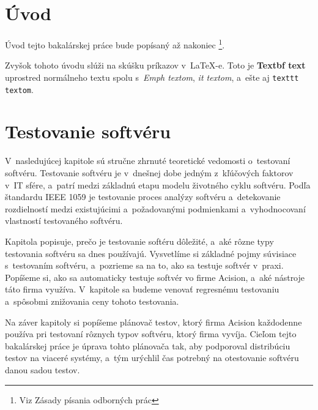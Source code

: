 



%
%
\chapter{Úvod}
\label{kapitola:uvod}
Úvod tejto bakalárskej práce bude popísaný až nakoniec
\footnote{Viz Zásady písania odborných prác}.

Zvyšok tohoto úvodu slúži na skúšku príkazov v~\LaTeX-e.
Toto je \textbf{Textbf text} uprostred normálneho textu spolu 
s~\emph{Emph textom}, {\it it textom}, a~ešte aj \texttt{texttt textom}.



%
%
\chapter{Testovanie softvéru}
\label{kapitola:testovanie_softveru}
V~nasledujúcej kapitole sú stručne zhrnuté teoretické vedomosti 
o~testovaní softvéru. 
Testovanie softvéru je v~dnešnej dobe jedným z~kľúčových faktorov v~IT 
sfére, a~patrí medzi základnú etapu modelu životného cyklu softvéru.
Podľa štandardu IEEE 1059 \cite{Ieee} je testovanie proces analýzy 
softvéru a~detekovanie rozdielností medzi existujúcimi a~požadovanými 
podmienkami a~vyhodnocovaní vlastností testovaného softvéru. 

Kapitola popisuje, prečo je testovanie softéru 
dôležité, a~aké rôzne typy testovania softvéru sa dnes používajú. 
Vysvetlíme si základné pojmy súvisiace s~testovaním softvéru, a~pozrieme
sa na to, ako sa testuje softvér v~praxi.
Popíšeme si, ako sa automaticky testuje softvér vo firme Acision, 
a~aké nástroje táto firma využíva. 
V~kapitole sa budeme venovať regresnému testovaniu a~spôsobmi znižovania
ceny tohoto testovania. 

Na záver kapitoly si popíšeme plánovač testov, ktorý firma Acision 
každodenne používa pri testovaní rôznych typov softvéru, ktorý firma vyvíja. 
Cieľom tejto bakalárskej práce je úprava tohto plánovača tak, aby 
podporoval distribúciu testov na viaceré systémy, a~tým urýchlil čas 
potrebný na otestovanie softvéru danou sadou testov. 

